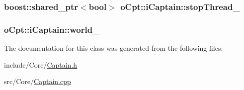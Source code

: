 \subsubsection[{\texorpdfstring{stop\+Thread\+\_\+}{stopThread_}}]{\setlength{\rightskip}{0pt plus 5cm}boost\+::shared\+\_\+ptr$<$bool$>$ o\+Cpt\+::i\+Captain\+::stop\+Thread\+\_\+\hspace{0.3cm}{\ttfamily [protected]}}\hypertarget{classo_cpt_1_1i_captain_a867451cb05e5073d61c0b6a2d0e7389c}{}\label{classo_cpt_1_1i_captain_a867451cb05e5073d61c0b6a2d0e7389c}
\subsubsection[{\texorpdfstring{world\+\_\+}{world_}}]{ o\+Cpt\+::i\+Captain\+::world\+\_\+\hspace{0.3cm}{\ttfamily [protected]}}\hypertarget{classo_cpt_1_1i_captain_a6e08906c347d5fc66605bfde73046194}{}\label{classo_cpt_1_1i_captain_a6e08906c347d5fc66605bfde73046194}


The documentation for this class was generated from the following files\+:\begin{DoxyCompactItemize}
\item 
include/\+Core/\hyperlink{_captain_8h}{Captain.\+h}\item 
src/\+Core/\hyperlink{_captain_8cpp}{Captain.\+cpp}\end{DoxyCompactItemize}
